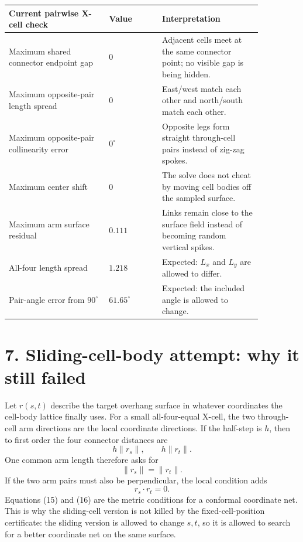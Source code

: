 \documentclass[11pt,letterpaper]{article}
\begin{document}
\begin{center}
\begin{tabular}{Y{0.34\linewidth}Y{0.18\linewidth}Y{0.34\linewidth}}
\toprule
Current pairwise X-cell check & Value & Interpretation \\
\midrule
Maximum shared connector endpoint gap & \(0\) & Adjacent cells meet at the same connector point; no visible gap is being hidden. \\
Maximum opposite-pair length spread & \(0\) & East/west match each other and north/south match each other. \\
Maximum opposite-pair collinearity error & \(0^\circ\) & Opposite legs form straight through-cell pairs instead of zig-zag spokes. \\
Maximum center shift & \(0\) & The solve does not cheat by moving cell bodies off the sampled surface. \\
Maximum arm surface residual & \(0.111\) & Links remain close to the surface field instead of becoming random vertical spikes. \\
All-four length spread & \(1.218\) & Expected: \(L_x\) and \(L_y\) are allowed to differ. \\
Pair-angle error from \(90^\circ\) & \(61.65^\circ\) & Expected: the included angle is allowed to change. \\
\bottomrule
\end{tabular}
\end{center}

\section*{7. Sliding-cell-body attempt: why it still failed}

Let \(r(s,t)\) describe the target overhang surface in whatever coordinates the cell-body lattice finally uses. For a small all-four-equal X-cell, the two through-cell arm directions are the local coordinate directions. If the half-step is \(h\), then to first order the four connector distances are
\[
h\|r_s\|,\qquad h\|r_t\|.
\tag{14}
\]
One common arm length therefore asks for
\[
\|r_s\|=\|r_t\|.
\tag{15}
\]
If the two arm pairs must also be perpendicular, the local condition adds
\[
r_s\cdot r_t=0.
\tag{16}
\]
Equations (15) and (16) are the metric conditions for a conformal coordinate net. This is why the sliding-cell version is not killed by the fixed-cell-position certificate: the sliding version is allowed to change \(s,t\), so it is allowed to search for a better coordinate net on the same surface.
\end{document}
